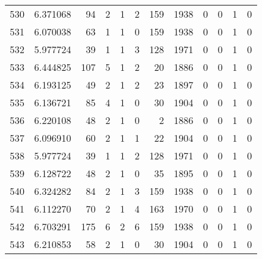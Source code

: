 \begin{tabular}{lrrrrrrrrrrr}
530 &  6.371068 &   94 &      2 &        1 &      2 &             159 &  1938 &               0 &               0 &               1 &               0 \\
531 &  6.070038 &   63 &      1 &        1 &      0 &             159 &  1938 &               0 &               0 &               1 &               0 \\
532 &  5.977724 &   39 &      1 &        1 &      3 &             128 &  1971 &               0 &               0 &               1 &               0 \\
533 &  6.444825 &  107 &      5 &        1 &      2 &              20 &  1886 &               0 &               0 &               1 &               0 \\
534 &  6.193125 &   49 &      2 &        1 &      2 &              23 &  1897 &               0 &               0 &               1 &               0 \\
535 &  6.136721 &   85 &      4 &        1 &      0 &              30 &  1904 &               0 &               0 &               1 &               0 \\
536 &  6.220108 &   48 &      2 &        1 &      0 &               2 &  1886 &               0 &               0 &               1 &               0 \\
537 &  6.096910 &   60 &      2 &        1 &      1 &              22 &  1904 &               0 &               0 &               1 &               0 \\
538 &  5.977724 &   39 &      1 &        1 &      2 &             128 &  1971 &               0 &               0 &               1 &               0 \\
539 &  6.128722 &   48 &      2 &        1 &      0 &              35 &  1895 &               0 &               0 &               1 &               0 \\
540 &  6.324282 &   84 &      2 &        1 &      3 &             159 &  1938 &               0 &               0 &               1 &               0 \\
541 &  6.112270 &   70 &      2 &        1 &      4 &             163 &  1970 &               0 &               0 &               1 &               0 \\
542 &  6.703291 &  175 &      6 &        2 &      6 &             159 &  1938 &               0 &               0 &               1 &               0 \\
543 &  6.210853 &   58 &      2 &        1 &      0 &              30 &  1904 &               0 &               0 &               1 &               0 \\

\end{tabular}
